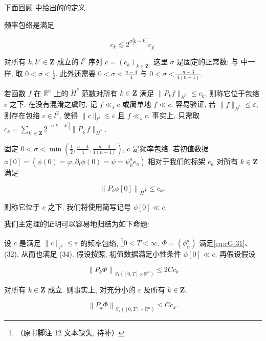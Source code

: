 下面回顾 \cite{gfref70} 中给出的的定义. 

\begin{definition}\label{def:cG-2.20}
频率包络是满足

\begin{equation}
c _ {k} \lesssim 2 ^ {\sigma | k - k ^ {\prime} |} c _ {k ^ {\prime}}\label{eq:cG-38}
\end{equation}

对所有 $k,  k' \in \mathbf{Z}$ 成立的 $l^2$ 序列 $c = (c_k)_{k \in \mathbf{Z}}$. 这里 $\sigma$ 是固定的正常数; 与 \cite{gfref70} 中一样, 取 $0 < \sigma < \frac{1}{2}$. 此外还需要 $0 < \sigma < \frac{n - 4}{4}$ 与 $0 < \sigma < \frac{n - 3}{4(n - 1)}$. 

若函数 $f$ 在 $\mathbb{R}^n$ 上的 $\dot{H}^s$ 范数对所有 $k\in \mathbf{Z}$ 满足 $\| P_kf\|_{\dot{H}^s}\leq c_k$, 则称它位于包络 $c$ 之下. 在没有混淆之虞时, 记 $f \ll_s c$ 或简单地 $f \ll c$. 容易验证, 若 $\| f\|_{\dot{H}^s}\leq \varepsilon$, 则存在包络 $c\in l^2$, 使得 $\| c\|_{l^2}\lesssim \varepsilon$ 且 $f \ll_s c$. 事实上, 只需取 $c_{k} = \sum_{k^{\prime}\in \mathbf{Z}}2^{-\sigma |k - k^{\prime}|}\| P_{k^{\prime}}f\|_{\dot{H}^s}$. 
\end{definition}

\begin{definition}\label{def:cG-2.21}
固定 $0 < \sigma < \min\left(\frac{1}{2},  \frac{n-4}{4},  \frac{n-3}{4(n-1)}\right)$, c 是频率包络. 若初值数据 $\phi[0] = \left(\phi(0) = \varphi,  \partial_t \phi(0) = \psi = \psi_0^a e_a\right)$ 相对于我们的标架 $e_a$ 对所有 $k \in \mathbf{Z}$ 满足

\[
\left\| P _ {k} \phi [ 0 ] \right\| _ {\dot {H} ^ {\frac {n}{2}}} \leq c _ {k}, 
\]

则称它位于 $c$ 之下. 我们将使用简写记号 $\phi[0] \ll c$. 
\end{definition}

我们主定理的证明可以容易地归结为如下命题:

\begin{proposition}[主命题]\label{prop:cG-2.22}
设 $c$ 是满足 $\| c \|_{l^2} \leq \varepsilon$ 的频率包络, \footnote{（原书脚注 12 文本缺失, 待补）}$0 < T < \infty$, $\Phi = (\phi_\alpha^a)$ 满足\eqref{eq:cG-31}、(32), 从而也满足 (34). 假设按照, 初值数据满足小性条件 $\phi[0] \ll c$. 再假设假设

\begin{equation}
\left\| P _ {k} \Phi \right\| _ {S _ {k} ([ 0,  T ] \times \mathbb {R} ^ {n})} \leq 2 C c _ {k}\label{eq:cG-39}
\end{equation}

对所有 $k \in \mathbf{Z}$ 成立. 则事实上, 对充分小的 $\varepsilon$ 及所有 $k \in \mathbf{Z}$, 

\begin{equation}
\left\| P _ {k} \Phi \right\| _ {S _ {k} ([ 0,  T ] \times \mathbb {R} ^ {n})} \leq C c _ {k}.\label{eq:cG-40}
\end{equation}
\end{proposition}

